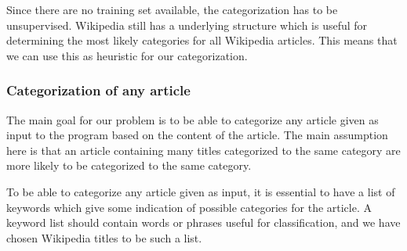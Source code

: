 Since there are no training set available, the categorization has to be unsupervised. Wikipedia still has a underlying structure which is useful for determining the most likely categories for all Wikipedia articles. This means that we can use this as heuristic for our categorization. 


\subsubsection{Categorization of any article}
The main goal for our problem is to be able to categorize any article given as input to the program based on the content of the article. The main assumption here is that an article containing many titles categorized to the same category are more likely to be categorized to the same category. 

To be able to categorize any article given as input, it is essential to have a list of keywords which give some indication of possible categories for the article. A keyword list should contain words or phrases useful for classification, and we have chosen Wikipedia titles to be such a list. 






